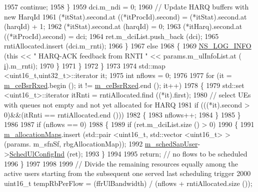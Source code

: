 \begin{DoxyCode}
1957                   \textcolor{keywordflow}{continue};
1958                 \}
1959               dci.m\_ndi = 0;
1960               \textcolor{comment}{// Update HARQ buffers with new HarqId}
1961               (*itStat).second.at ((*itProcId).second) = (*itStat).second.at (harqId) + 1;
1962               (*itStat).second.at (harqId) = 0;
1963               (*itHarq).second.at ((*itProcId).second) = dci;
1964               ret.m\_dciList.push\_back (dci);
1965               rntiAllocated.insert (dci.m\_rnti);
1966             \}
1967           \textcolor{keywordflow}{else}
1968             \{
1969               \hyperlink{group__logging_gafbd73ee2cf9f26b319f49086d8e860fb}{NS\_LOG\_INFO} (\textcolor{keyword}{this} << \textcolor{stringliteral}{" HARQ-ACK feedback from RNTI "} << params.m\_ulInfoList.at (
      \hyperlink{bernuolliDistribution_8m_a6f6ccfcf58b31cb6412107d9d5281426}{i}).m\_rnti);
1970             \}
1971         \}
1972     \}
1973 
1974   std::map <uint16\_t,uint32\_t>::iterator it;
1975   \textcolor{keywordtype}{int} nflows = 0;
1976 
1977   \textcolor{keywordflow}{for} (it = \hyperlink{classns3_1_1CqaFfMacScheduler_ae2ec92c28a8adb7f5d63d658fd1e3949}{m\_ceBsrRxed}.begin (); it != \hyperlink{classns3_1_1CqaFfMacScheduler_ae2ec92c28a8adb7f5d63d658fd1e3949}{m\_ceBsrRxed}.end (); it++)
1978     \{
1979       std::set <uint16\_t>::iterator itRnti = rntiAllocated.find ((*it).first);
1980       \textcolor{comment}{// select UEs with queues not empty and not yet allocated for HARQ}
1981       \textcolor{keywordflow}{if} (((*it).second > 0)&&(itRnti == rntiAllocated.end ()))
1982         \{
1983           nflows++;
1984         \}
1985     \}
1986 
1987   \textcolor{keywordflow}{if} (nflows == 0)
1988     \{
1989       \textcolor{keywordflow}{if} (ret.m\_dciList.size () > 0)
1990         \{
1991           \hyperlink{classns3_1_1CqaFfMacScheduler_a3b02c0d7a89f3ed393066ba9bfda6210}{m\_allocationMaps}.insert (std::pair <uint16\_t, std::vector <uint16\_t> > (params.
      m\_sfnSf, rbgAllocationMap));
1992           \hyperlink{classns3_1_1CqaFfMacScheduler_a42f4b19ce093643c5fa8202ac18ec569}{m\_schedSapUser}->\hyperlink{classns3_1_1FfMacSchedSapUser_a1b89636256701a84d990db7db8aea874}{SchedUlConfigInd} (ret);
1993         \}
1994 
1995       \textcolor{keywordflow}{return};  \textcolor{comment}{// no flows to be scheduled}
1996     \}
1997 
1998 
1999   \textcolor{comment}{// Divide the remaining resources equally among the active users starting from the subsequent one served
       last scheduling trigger}
2000   uint16\_t tempRbPerFlow = (ffrUlBandwidth) / (nflows + rntiAllocated.size ());

\end{DoxyCode}
